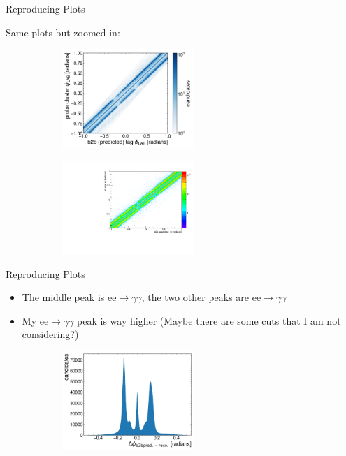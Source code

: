 \documentclass[10pt]{beamer}
\begin{document}
{\begin{frame}{Reproducing Plots}
	
	Same plots but zoomed in:
	
		\begin{figure}
		\centering
		\begin{subfigure}{.5\textwidth}
			\centering
			\includegraphics[width=5cm]{Plots/ZommedSam.jpeg}
			
			\label{fig:sub1}
		\end{subfigure}%
		\begin{subfigure}{.5\textwidth}
			\centering
			\includegraphics[width=5cm]{Plots/zommedb2b}
			
			\label{fig:sub2}
		\end{subfigure}
		
		\label{fig:test}
	\end{figure}
		
\end{frame}


\begin{frame}{Reproducing Plots}
\begin{itemize} 
	\item The middle peak is $\textrm{ee} \rightarrow \gamma \gamma$, the two other peaks are $\textrm{ee} \rightarrow \gamma \gamma$
	\item My $\textrm{ee} \rightarrow \gamma \gamma$ peak is way higher (Maybe there are some cuts that I am not considering?)

\end{itemize}
\begin{figure}
	\centering
	\begin{subfigure}{.5\textwidth}
		\centering
		\includegraphics[width=5cm]{Plots/deltaPhiSam.jpeg}
	

\end{subfigure}
\end{figure}
\end{frame}}
\end{document}
